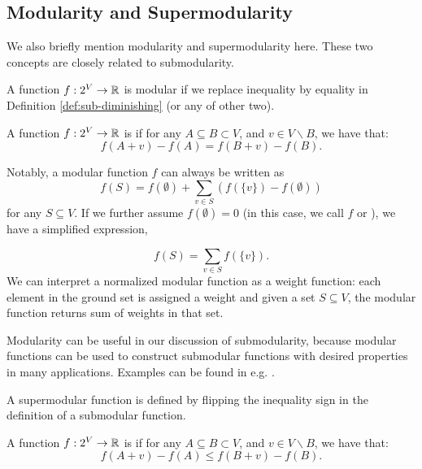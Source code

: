 \subsection{Modularity and Supermodularity}
We also briefly mention modularity and supermodularity here. These two concepts are closely related to submodularity. 

A function $f: 2^V \rightarrow \mathbb{R}$ is modular if we replace inequality by equality in Definition \ref{def:sub-diminishing} (or any of other two).  

\begin{definition}[Modularity]
  \label{def:modular}
  A function $f: 2^V \rightarrow \mathbb{R}$ is  if for any $A \subseteq B \subset V$, and $v \in V\backslash B$, we have that:
  \begin{equation}
    \label{eq:modular}
    f(A + v) - f(A) = f(B + v) - f(B).
  \end{equation}
\end{definition}
Notably, a modular function $f$ can always be written as
$$f(S) = f(\emptyset) + \sum_{v\in S} \left( f(\{v\}) - f(\emptyset) \right)$$
for any $S \subseteq V$. If we further assume $f(\emptyset) = 0$ (in this case, we call $f$  or ), we have a simplified expression,

$$f(S) = \sum_{v\in S} f(\{v\}).$$
We can interpret a normalized modular function as a weight function: each element in the ground set is assigned a weight and given a set $S \subseteq V$, the modular function returns sum of weights in that set.



Modularity can be useful in our discussion of submodularity, because modular functions can be used to construct submodular functions with desired properties in many applications. Examples can be found in e.g. \cite{LB11,LB11word}.




A supermodular function is defined by flipping the inequality sign in the definition of a submodular function. 
\begin{definition}[Supermodularity]
  \label{def:supermodular}
  A function $f: 2^V \rightarrow \mathbb{R}$ is  if for any $A \subseteq B \subset V$, and $v \in V\backslash B$, we have that:
  \begin{equation}
    \label{eq:submodular}
    f(A + v) - f(A) \leq f(B + v) - f(B).
  \end{equation}
\end{definition}

